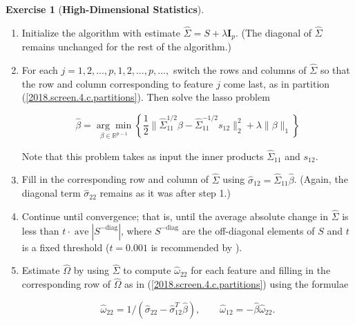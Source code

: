 \documentclass{article}
\theoremstyle{definition}
\newtheorem{exercise}{Exercise}
\theoremstyle{definition}
\theoremstyle{definition}
\theoremstyle{definition}
\begin{document}
\begin{exercise}[\textbf{High-Dimensional Statistics}]
\begin{enumerate}[(a)]
\begin{enumerate}[1.]

\item Initialize the algorithm with estimate \(\hat{\Sigma} = S + \lambda \boldsymbol{I}_p\). (The diagonal of \(\hat{\Sigma}\) remains unchanged for the rest of the algorithm.)

\item For each \(j = 1, 2, \ldots, p, 1, 2, \ldots, p, \ldots, \) switch the rows and columns of \(\hat{\Sigma}\) so that the row and column corresponding to feature \(j\) come last, as in partition  (\ref{2018.screen.4.c.partitions}). Then solve the lasso problem

\begin{equation}
\hat{\beta} = \underset{\beta \in \mathbb{R}^{p-1}}{\arg \min} \left\{ \frac{1}{2} \lVert \hat{\Sigma}_{11}^{1/2} \beta - \hat{\Sigma}_{11}^{-1/2}s_{12}  \rVert_2^2 + \lambda \lVert \beta \rVert_1 \right\}
\end{equation}

Note that this problem takes as input the inner products \(\hat{\Sigma}_{11}\) and \(s_{12}\). 

\item Fill in the corresponding row and column of \(\hat{\Sigma}\) using \(\hat{\sigma}_{12} = \hat{\Sigma}_{11} \hat{\beta}\). (Again, the diagonal term \(\hat{\sigma}_{22}\) remains as it was after step 1.)

\item Continue until convergence; that is, until the average absolute change in \(\hat{\Sigma}\) is less than \(t \cdot \operatorname{ave} | S^{- \text{diag}} |\), where \( S^{- \text{diag}}\) are the off-diagonal elements of \(S\) and \(t\) is a fixed threshold (\(t = 0.001\) is recommended by \citep{Friedman2008}).

\item Estimate \(\hat{\Omega}\) by using \(\hat{\Sigma}\) to compute \(\hat{\omega}_{22}\) for each feature and filling in the corresponding row of \(\hat{\Omega}\) as in (\ref{2018.screen.4.c.partitions}) using the formulae

\begin{equation}\label{2018.screen.4.c.precision.matrix.formula}
\hat{\omega}_{22} = 1/ \left( \hat{\sigma}_{22} - \hat{\sigma}_{12}^T \hat{\beta}\right), \qquad \hat{\omega}_{12} = - \hat{\beta}\hat{\omega}_{22}.
\end{equation}

\end{enumerate}


\end{enumerate}
\end{exercise}
\end{document}
